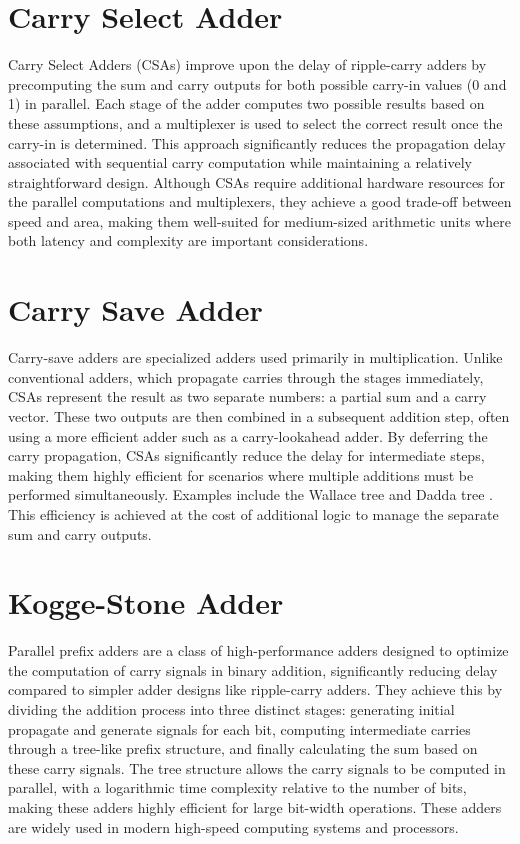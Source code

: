 \section{Carry Select Adder}
Carry Select Adders (CSAs) improve upon the delay of ripple-carry adders by precomputing the sum and carry outputs for both possible carry-in values (0 and 1) in parallel. Each stage of the adder computes two possible results based on these assumptions, and a multiplexer is used to select the correct result once the carry-in is determined. This approach significantly reduces the propagation delay associated with sequential carry computation while maintaining a relatively straightforward design. Although CSAs require additional hardware resources for the parallel computations and multiplexers, they achieve a good trade-off between speed and area, making them well-suited for medium-sized arithmetic units where both latency and complexity are important considerations.

\section{Carry Save Adder}
Carry-save adders are specialized adders used primarily in multiplication. Unlike conventional adders, which propagate carries through the stages immediately, CSAs represent the result as two separate numbers: a partial sum and a carry vector. These two outputs are then combined in a subsequent addition step, often using a more efficient adder such as a carry-lookahead adder. By deferring the carry propagation, CSAs significantly reduce the delay for intermediate steps, making them highly efficient for scenarios where multiple additions must be performed simultaneously. Examples include the Wallace tree \cite{wallace1964} and Dadda tree \cite{dadda1965}. This efficiency is achieved at the cost of additional logic to manage the separate sum and carry outputs.






\section{Kogge-Stone Adder} \label{sec:kogge-stone-adder}
Parallel prefix adders are a class of high-performance adders designed to optimize the computation of carry signals in binary addition, significantly reducing delay compared to simpler adder designs like ripple-carry adders. They achieve this by dividing the addition process into three distinct stages: generating initial propagate and generate signals for each bit, computing intermediate carries through a tree-like prefix structure, and finally calculating the sum based on these carry signals. The tree structure allows the carry signals to be computed in parallel, with a logarithmic time complexity relative to the number of bits, making these adders highly efficient for large bit-width operations. These adders are widely used in modern high-speed computing systems and processors.

